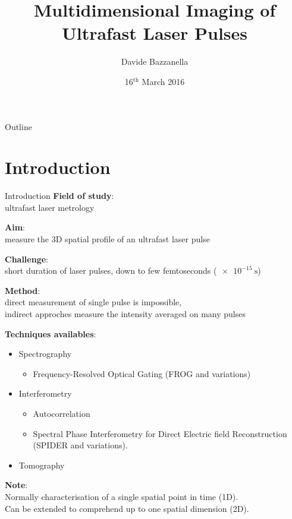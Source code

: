 \documentclass[11pt]{beamer}
\author{Davide Bazzanella}
\title{Multidimensional Imaging of Ultrafast Laser Pulses}
\institute{Imperial College London}
\date{16$^{\mathrm{th}}$ March 2016}
\begin{document}
\begin{frame}
\titlepage
\end{frame}

\begin{frame}{Outline}
\tableofcontents
\end{frame}

\section{Introduction}
\begin{frame}{Introduction}
\textbf{Field of study}:\\
	ultrafast laser metrology
	
\vspace{15pt}
\textbf{Aim}:\\
	measure the 3D spatial profile of an ultrafast laser pulse

\vspace{15pt}
\textbf{Challenge}:\\
	short duration of laser pulses, down to few femtoseconds ($\SI{e-15}{\s}$)
	
\vspace{15pt}
\textbf{Method}:\\
	direct measurement of single pulse is impossible,\\
	indirect approches measure the intensity averaged on many pulses
\end{frame}

\begin{frame}
\textbf{Techniques availables}:\\
\begin{itemize}
\item Spectrography
	\begin{itemize}
		\item Frequency-Resolved Optical Gating (FROG and variations)
	\end{itemize}
\item Interferometry
	\begin{itemize}
		\item Autocorrelation
		\item Spectral Phase Interferometry for Direct Electric field Reconstruction (SPIDER and variations).
	\end{itemize}
	\item Tomography
\end{itemize}

\vspace{15pt}
\textbf{Note}:\\
Normally characterisation of a single spatial point in time (1D).\\
Can be extended to comprehend up to one spatial dimension (2D).
\end{frame}
\end{document}
